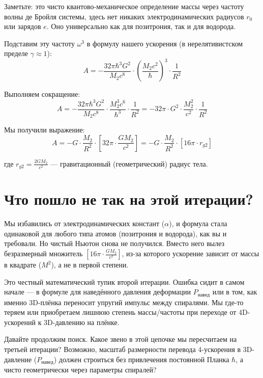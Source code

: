 \documentclass[12pt,a4paper]{article}
\begin{document}
Заметьте: это чисто квантово-механическое определение массы через частоту волны де Бройля системы, здесь нет никаких электродинамических радиусов $r_0$ или зарядов $e$. Оно универсально как для позитрония, так и для водорода.

Подставим эту частоту $\omega^3$ в формулу нашего ускорения (в нерелятивистском пределе $\gamma \approx 1$):
\begin{equation}
A = - \frac{32\pi \hbar^3 G^2}{M_2 c^8} \cdot \left( \frac{M_2 c^2}{\hbar} \right)^3 \cdot \frac{1}{R^2}
\end{equation}

Выполняем сокращение:
\begin{equation}
A = - \frac{32\pi \hbar^3 G^2}{M_2 c^8} \cdot \frac{M_2^3 c^6}{\hbar^3} \cdot \frac{1}{R^2} = - 32\pi \cdot G^2 \cdot \frac{M_2^2}{c^2} \cdot \frac{1}{R^2}
\end{equation}

Мы получили выражение:
\begin{equation}
A = - G \cdot \frac{M_2}{R^2} \cdot \left[ 32\pi \cdot \frac{G M_2}{c^2} \right] = - G \cdot \frac{M_2}{R^2} \cdot \left[ 16\pi \cdot r_{g2} \right]
\end{equation}

где $r_{g2} = \frac{2G M_2}{c^2}$ — гравитационный (геометрический) радиус тела.

\section*{Что пошло не так на этой итерации?}

Мы избавились от электродинамических констант ($\alpha$), и формула стала одинаковой для любого типа атомов (позитрония и водорода), как вы и требовали. Но чистый Ньютон снова не получился. Вместо него вылез безразмерный множитель $\left[ 16\pi \cdot \frac{G M_2}{c^2} \right]$, из-за которого ускорение зависит от массы в квадрате ($M^2$), а не в первой степени.

Это честный математический тупик второй итерации. Ошибка сидит в самом начале — в формуле для наведённого давления деформации $P_{навед}$ или в том, как именно 3D-плёнка переносит упругий импульс между спиралями. Мы где-то теряем или приобретаем лишнюю степень массы/частоты при переходе от 4D-ускорений к 3D-давлению на плёнке.

Давайте продолжим поиск. Какое звено в этой цепочке мы пересчитаем на третьей итерации? Возможно, масштаб размерности перевода 4-ускорения в 3D-давление ($P_{навед}$) должен строиться без привлечения постоянной Планка $\hbar$, а чисто геометрически через параметры спиралей?
\end{document}
